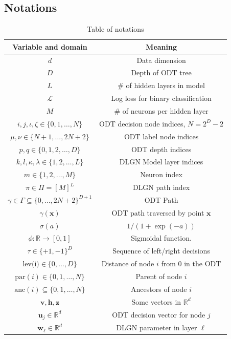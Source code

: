\documentclass{article}
\theoremstyle{plain}
\theoremstyle{definition}
\theoremstyle{remark}
\newcommand{\R}{{\mathbb R}}
\newcommand{\1}{{\mathbf 1}}
\newcommand{\0}{{\mathbf 0}}
\newcommand{\h}{{\mathbf h}}
\newcommand{\z}{{\mathbf z}}
\newcommand{\w}{{\mathbf w}}
\newcommand{\x}{{\mathbf x}}
\newcommand{\bu}{{\mathbf u}}
\newcommand{\bv}{{\mathbf v}}
\renewcommand{\>}{{\rightarrow}}
\begin{document}
\subsection{Notations}
\begin{table}[]
    \centering
    \caption{Table of notations}
    \begin{tabular}{c|c}
    Variable and domain & Meaning \\ \hline
    $d$ & Data dimension \\
    $D$ & Depth of ODT tree \\
    $L$ & \# of hidden layers in model  \\
    $\mathcal{L}$ & Log loss for binary classification \\
    $M$ & \# of neurons per hidden layer  \\
    $i,j, \iota, \zeta \in \{0,1,\ldots,N\}$  & ODT decision node indices, $N=2^D-2$ \\
    $\mu, \nu \in \{N+1,\ldots,2N+2\}$ & ODT label node indices \\
    $p,q \in \{0,1,2,\ldots,D\}$ & ODT depth indices \\
    $k,l,\kappa,\lambda \in \{1,2,\ldots,L\}$ & DLGN Model layer indices  \\
    $m \in \{1,2,\ldots,M\}$ & Neuron index \\ 
    $\pi \in \Pi=[M]^L$ & DLGN path index \\
    $\gamma \in \Gamma \subseteq \{0,\ldots,2N+2\}^{D+1}$ & ODT Path \\
    $\gamma(\x)$ & ODT path traversed by point $\x$ \\
    $\sigma(a)$ & $1/(1+\exp(-a))$ \\
    $\phi:\R\>[0,1]$ & Sigmoidal function. \\
    $\tau \in \{+1,-1\}^D$ & Sequence of left/right decisions \\
    $\text{lev(i)} \in \{0,\ldots,D\}$ & Distance of node $i$ from $0$ in the ODT \\
    $\text{par}(i) \in \{0,1,\ldots,N \}$ & Parent of node $i$ \\
    $\text{anc}(i) \subseteq \{0,1,\ldots,N \}$ & Ancestors of node $i$ \\
    $\bv,\h,\z$ & Some vectors in $\R^d$ \\
    $\bu_j \in \R^d$ & ODT decision vector for node $j$ \\
    $\w_\ell \in \R^d$ & DLGN parameter in layer $\ell$
    \end{tabular}
    
    
    \label{tab:notations}
\end{table}
\end{document}
